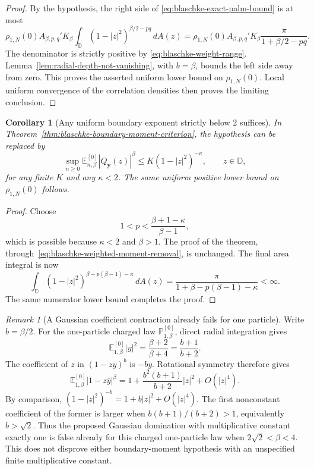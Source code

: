 \documentclass[11pt,a4paper]{article}
\numberwithin{equation}{section}
\newtheorem{corollary}[theorem]{Corollary}
\theoremstyle{definition}
\theoremstyle{remark}
\newtheorem{remark}[theorem]{Remark}
\newcommand{\D}{\mathbb D}
\begin{document}
\begin{proof}
By the hypothesis, the right side of
\eqref{eq:blaschke-exact-palm-bound} is at most
\[
 \rho_{1,N}(0)A_{\beta,p,q}'K_\beta
 \int_\D(1-|z|^2)^{\beta/2-pq}\,dA(z)
 =\rho_{1,N}(0)A_{\beta,p,q}'K_\beta
       \frac{\pi}{1+\beta/2-pq}.
\]
The denominator is strictly positive by
\eqref{eq:blaschke-weight-range}. Lemma~\ref{lem:radial-depth-not-vanishing},
with $b=\beta$, bounds the left side away from zero. This proves
the asserted uniform lower bound on $\rho_{1,N}(0)$. Local uniform
convergence of the correlation densities then proves the limiting
conclusion.
\end{proof}

\begin{corollary}[Any uniform boundary exponent strictly below $2$ suffices]
\label{cor:blaschke-weaker-boundary-exponent}
In Theorem~\ref{thm:blaschke-boundary-moment-criterion}, the
hypothesis can be replaced by
\begin{equation}
 \sup_{n\ge0}\mathbb E_{n,\beta}^{[0]}|Q_{\mathbf y}(z)|^\beta
 \le K(1-|z|^2)^{-\kappa},\qquad z\in\D,
 \label{eq:blaschke-weaker-boundary-exponent}
\end{equation}
for any finite $K$ and any $\kappa<2$. The same uniform positive
lower bound on $\rho_{1,N}(0)$ follows.
\end{corollary}

\begin{proof}
Choose
\[
 1<p<\frac{\beta+1-\kappa}{\beta-1},
\]
which is possible because $\kappa<2$ and $\beta>1$. The proof of
the theorem, through~\eqref{eq:blaschke-weighted-moment-removal},
is unchanged. The final area integral is now
\[
 \int_\D(1-|z|^2)^{\beta-p(\beta-1)-\kappa}\,dA(z)
 =\frac{\pi}{1+\beta-p(\beta-1)-\kappa}<\infty.
\]
The same numerator lower bound completes the proof.
\end{proof}

\begin{remark}[A Gaussian coefficient contraction already fails for one particle]
Write $b=\beta/2$. For the one-particle charged law
$\mathbb P_{1,\beta}^{[0]}$, direct radial integration gives
\[
 \mathbb E_{1,\beta}^{[0]}|y|^2
 =\frac{\beta+2}{\beta+4}=\frac{b+1}{b+2}.
\]
The coefficient of $z$ in $(1-z\overline y)^b$ is
$-b\overline y$. Rotational symmetry therefore gives
\[
 \mathbb E_{1,\beta}^{[0]}|1-z\overline y|^\beta
 =1+\frac{b^2(b+1)}{b+2}|z|^2+O(|z|^4).
\]
By comparison, $(1-|z|^2)^{-b}=1+b|z|^2+O(|z|^4)$.
The first nonconstant coefficient of the former is larger when
$b(b+1)/(b+2)>1$, equivalently $b>\sqrt2$. Thus the proposed
Gaussian domination with multiplicative constant exactly one is
false already for this charged one-particle law when
$2\sqrt2<\beta<4$. This does not disprove either boundary-moment
hypothesis with an unspecified finite multiplicative constant.
\end{remark}
\end{document}
